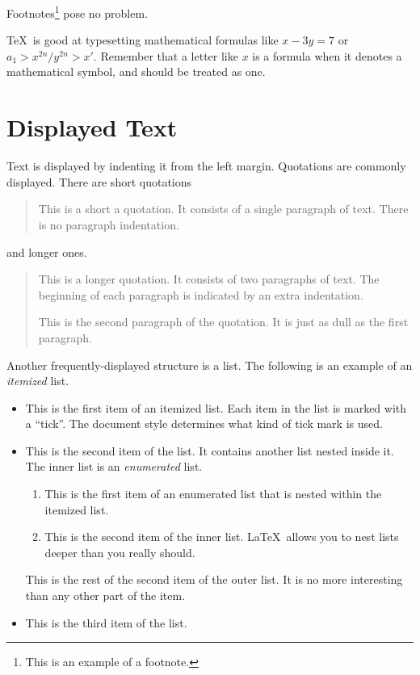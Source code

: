 Footnotes\footnote{This is an example of a footnote.}
pose no problem.
 
\TeX\ is good at typesetting mathematical formulas like
       \( x-3y = 7 \) 
or
       \( a_{1} > x^{2n} / y^{2n} > x' \).
Remember that a letter like
       $x$        %
is a formula when it denotes a mathematical symbol, and should
be treated as one.
 
\section{Displayed Text}
 
Text is displayed by indenting it from the left margin.
Quotations are commonly displayed.  There are short quotations
\begin{quote}
   This is a short a quotation.  It consists of a 
   single paragraph of text.  There is no paragraph
   indentation.
\end{quote}
and longer ones.
\begin{quotation}
   This is a longer quotation.  It consists of two paragraphs
   of text.  The beginning of each paragraph is indicated
   by an extra indentation.
 
   This is the second paragraph of the quotation.  It is just
   as dull as the first paragraph.
\end{quotation}
Another frequently-displayed structure is a list.
The following is an example of an {\em itemized} list.
\begin{itemize}
   \item  This is the first item of an itemized list.  Each item 
          in the list is marked with a ``tick''.  The document
          style determines what kind of tick mark is used.
 
   \item  This is the second item of the list.  It contains another
          list nested inside it.  The inner list is an {\em enumerated}
          list.
          \begin{enumerate}
              \item This is the first item of an enumerated list that
                    is nested within the itemized list.
 
              \item This is the second item of the inner list.  \LaTeX\
                    allows you to nest lists deeper than you really should.
          \end{enumerate}
          This is the rest of the second item of the outer list.  It
          is no more interesting than any other part of the item.
   \item  This is the third item of the list.
\end{itemize}
